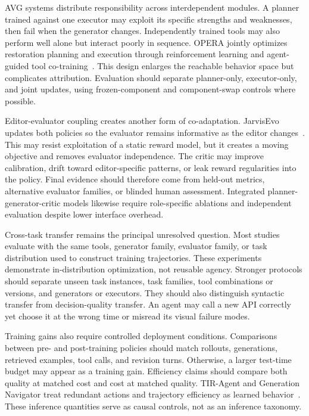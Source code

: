 AVG systems distribute responsibility across interdependent modules. A planner trained against one executor may exploit its specific strengths and weaknesses, then fail when the generator changes. Independently trained tools may also perform well alone but interact poorly in sequence. OPERA jointly optimizes restoration planning and execution through reinforcement learning and agent-guided tool co-training~\cite{avg260522104}. This design enlarges the reachable behavior space but complicates attribution. Evaluation should separate planner-only, executor-only, and joint updates, using frozen-component and component-swap controls where possible.

Editor-evaluator coupling creates another form of co-adaptation. JarvisEvo updates both policies so the evaluator remains informative as the editor changes~\cite{avg251123002}. This may resist exploitation of a static reward model, but it creates a moving objective and removes evaluator independence. The critic may improve calibration, drift toward editor-specific patterns, or leak reward regularities into the policy. Final evidence should therefore come from held-out metrics, alternative evaluator families, or blinded human assessment. Integrated planner-generator-critic models likewise require role-specific ablations and independent evaluation despite lower interface overhead.

Cross-task transfer remains the principal unresolved question. Most studies evaluate with the same tools, generator family, evaluator family, or task distribution used to construct training trajectories. These experiments demonstrate in-distribution optimization, not reusable agency. Stronger protocols should separate unseen task instances, task families, tool combinations or versions, and generators or executors. They should also distinguish syntactic transfer from decision-quality transfer. An agent may call a new API correctly yet choose it at the wrong time or misread its visual failure modes.

Training gains also require controlled deployment conditions. Comparisons between pre- and post-training policies should match rollouts, generations, retrieved examples, tool calls, and revision turns. Otherwise, a larger test-time budget may appear as a training gain. Efficiency claims should compare both quality at matched cost and cost at matched quality. TIR-Agent and Generation Navigator treat redundant actions and trajectory efficiency as learned behavior~\cite{avg260327742,avg260517969}. These inference quantities serve as causal controls, not as an inference taxonomy.


